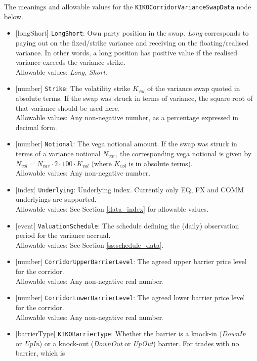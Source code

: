 The meanings and allowable values for the \lstinline!KIKOCorridorVarianceSwapData! node below.

\begin{itemize}
  \item{}[longShort] \lstinline!LongShort!: Own party position in the swap. \emph{Long} corresponds to paying out on the
  fixed/strike variance and receiving on the floating/realised variance. In other words, a long position has
  positive value if the realised variance exceeds the variance strike. \\
  Allowable values: \emph{Long, Short}.
  \item{}[number] \lstinline!Strike!: The volatility strike $K_{vol}$ of the variance swap quoted in absolute terms.
  If the swap was struck in terms of variance, the square root of that variance should be used here. \\
  Allowable values: Any non-negative number, as a percentage expressed in decimal form.
  \item{}[number] \lstinline!Notional!: The vega notional amount. If the swap was struck in terms of a variance notional
  $N_{var}$, the corresponding vega notional is given by $N_{vol} = N_{var} \cdot 2 \cdot 100 \cdot K_{vol}$ (where
  $K_{vol}$ is in absolute terms). \\
  Allowable values: Any non-negative number.
  \item{}[index] \lstinline!Underlying!: Underlying index. Currently only EQ, FX and COMM underlyings are supported. \\
  Allowable values: See Section \ref{data_index} for allowable values.
  \item{}[event] \lstinline!ValuationSchedule!: The schedule defining the (daily) observation period for the
  variance accrual. \\
  Allowable values: See Section \ref{ss:schedule_data}.
  \item{}[number] \lstinline!CorridorUpperBarrierLevel!: The agreed upper barrier price level for the corridor. \\
  Allowable values: Any non-negative real number.
  \item{}[number] \lstinline!CorridorLowerBarrierLevel!: The agreed lower barrier price level for the corridor. \\
  Allowable values: Any non-negative real number.
  \item{}[barrierType] \lstinline!KIKOBarrierType!: Whether the barrier is a knock-in (\emph{DownIn}
  or \emph{UpIn}) or a knock-out (\emph{DownOut} or \emph{UpOut}) barrier. For trades with no barrier, which is

\end{itemize}
